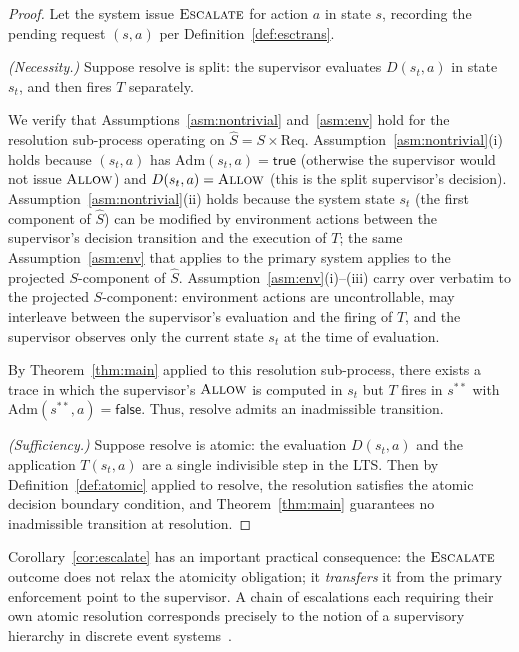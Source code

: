\documentclass[11pt]{article}
\theoremstyle{plain}
\theoremstyle{definition}
\theoremstyle{remark}
\newcommand{\Allow}{\textsc{Allow}}
\newcommand{\Escalate}{\textsc{Escalate}}
\newcommand{\Adm}{\mathrm{Adm}}
\newcommand{\Req}{\mathrm{Req}}
\begin{document}
\begin{proof}
Let the system issue $\Escalate$ for action $a$ in state $s$, recording the
pending request $(s, a)$ per Definition~\ref{def:esctrans}.

\emph{(Necessity.)}  Suppose $\mathrm{resolve}$ is split: the supervisor
evaluates $D(s_t, a)$ in state $s_t$, and then fires $T$ separately.

We verify that Assumptions~\ref{asm:nontrivial} and~\ref{asm:env} hold for
the resolution sub-process operating on $\hat{S} = S \times \Req$.
Assumption~\ref{asm:nontrivial}(i) holds because $(s_t, a)$ has
$\Adm(s_t, a) = \mathsf{true}$ (otherwise the supervisor would not issue
$\Allow$) and $D(s_t, a) = \Allow$ (this is the split supervisor's decision).
Assumption~\ref{asm:nontrivial}(ii) holds because the system state $s_t$
(the first component of $\hat{S}$) can be modified by environment actions
between the supervisor's decision transition and the execution of $T$;
the same Assumption~\ref{asm:env} that applies to the primary system applies
to the projected $S$-component of $\hat{S}$.
Assumption~\ref{asm:env}(i)--(iii) carry over verbatim to the projected
$S$-component: environment actions are uncontrollable, may interleave
between the supervisor's evaluation and the firing of $T$, and the
supervisor observes only the current state $s_t$ at the time of evaluation.

By Theorem~\ref{thm:main} applied to this resolution sub-process, there
exists a trace in which the supervisor's $\Allow$ is computed in $s_t$ but
$T$ fires in $s^{**}$ with $\Adm(s^{**}, a) = \mathsf{false}$.
Thus, $\mathrm{resolve}$ admits an inadmissible transition.

\emph{(Sufficiency.)}  Suppose $\mathrm{resolve}$ is atomic: the evaluation
$D(s_t, a)$ and the application $T(s_t, a)$ are a single indivisible step in
the LTS.  Then by Definition~\ref{def:atomic} applied to $\mathrm{resolve}$,
the resolution satisfies the atomic decision boundary condition, and
Theorem~\ref{thm:main} guarantees no inadmissible transition at resolution.
\end{proof}

Corollary~\ref{cor:escalate} has an important practical consequence: the
$\Escalate$ outcome does not relax the atomicity obligation; it \emph{transfers}
it from the primary enforcement point to the supervisor.  A chain of escalations
each requiring their own atomic resolution corresponds precisely to the notion
of a supervisory hierarchy in discrete event systems~\cite{ramadge87}.
\end{document}
